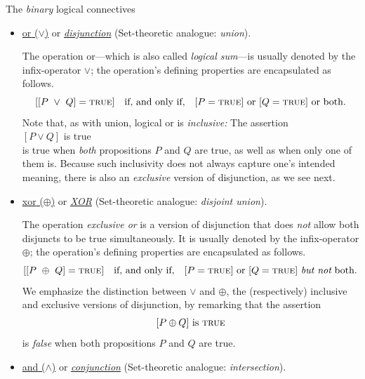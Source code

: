  {\small\sf The {\em binary} logical connectives}
\begin{itemize}
\item
\underline{{\sc or} ($\vee$)} or \underline{\it disjunction}
\hspace*{.1in}
{\small\sf (Set-theoretic analogue: {\em union})}.

\smallskip

The operation {\sc or}---which is also called {\em logical sum}---is usually denoted by the infix-operator $\vee$; the operation's defining properties are encapsulated as follows.
\[
[[P \ \vee \ Q] =  \mbox{\sc true}] \ \ \mbox{ if, and only if, } \ \ 
[P = \mbox{\sc true}] \mbox{ or }
[Q = \mbox{\sc true}] \mbox{ or both}.
\]
Note that, as with union, logical {\sc or} is {\em inclusive:}  The assertion \\
\hspace*{.35in}$[P \vee Q]$ is \mbox{\sc true} \\
%
is true when {\em both} propositions $P$ and $Q$ are true, as well as when only one of them is.  Because such inclusivity does not always capture one's intended meaning, there is also an {\em exclusive} version of disjunction, as we see next.

\medskip\item 
\underline{{\sc xor} ($\oplus$)} or \underline{\it XOR}
\hspace*{.1in}
{\small\sf (Set-theoretic analogue: {\em disjoint union})}.

\smallskip

The operation {\em exclusive or} is a version of disjunction that does {\em not} allow both disjuncts to be true simultaneously.  It is usually denoted by the infix-operator $\oplus$; the operation's defining properties are encapsulated as follows.
\[
[[P \ \oplus \ Q] =  \mbox{\sc true}] \ \ \mbox{ if, and only if, } \ \ 
[P = \mbox{\sc true}] \mbox{ or }
[Q = \mbox{\sc true}] \mbox{ {\em but not} both}.
\]
We emphasize the distinction between $\vee$ and $\oplus$, the (respectively) inclusive and exclusive versions of disjunction, by remarking that the assertion
\[
[P \oplus Q]  \mbox{ is } \mbox{\sc true}
\]
is {\em false} when both propositions $P$ and $Q$ are true.

\medskip\item
\underline{{\sc and} ($\wedge$)} or \underline{\it conjunction}
\hspace*{.1in}
{\small\sf (Set-theoretic analogue: {\em intersection})}.
\index{logical operation!conjunction ($\wedge$)}


\end{itemize}

